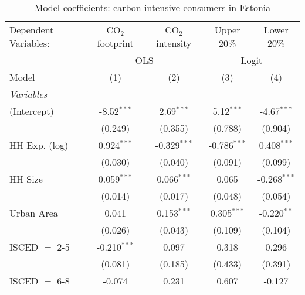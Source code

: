 
\begin{table}[htbp!]
   \centering
   \small
   \begin{adjustbox}{width = 1\textwidth, max height = 0.95\textheight, center}
      \begin{threeparttable}[b]
         \caption{\label{tab:Logit_1_EST} Model coefficients: carbon-intensive consumers in Estonia}
         \begin{tabular}{lcccc}
            \tabularnewline \midrule \midrule
            Dependent Variables: & CO$_{2}$ footprint & CO$_{2}$ intensity & Upper 20\%     & Lower 20\%\\   
             & \multicolumn{2}{c}{OLS} & \multicolumn{2}{c}{Logit} \\ 
            Model                & (1)                & (2)                & (3)            & (4)\\  
            \midrule
            \emph{Variables}\\
            (Intercept)          & -8.52$^{***}$      & 2.69$^{***}$       & 5.12$^{***}$   & -4.67$^{***}$\\   
                                 & (0.249)            & (0.355)            & (0.788)        & (0.904)\\   
            HH Exp. (log)        & 0.924$^{***}$      & -0.329$^{***}$     & -0.786$^{***}$ & 0.408$^{***}$\\   
                                 & (0.030)            & (0.040)            & (0.091)        & (0.099)\\   
            HH Size              & 0.059$^{***}$      & 0.066$^{***}$      & 0.065          & -0.268$^{***}$\\   
                                 & (0.014)            & (0.017)            & (0.048)        & (0.054)\\   
            Urban Area           & 0.041              & 0.153$^{***}$      & 0.305$^{***}$  & -0.220$^{**}$\\   
                                 & (0.026)            & (0.043)            & (0.109)        & (0.104)\\   
            ISCED $=$ 2-5        & -0.210$^{***}$     & 0.097              & 0.318          & 0.296\\   
                                 & (0.081)            & (0.185)            & (0.433)        & (0.391)\\   
            ISCED $=$ 6-8        & -0.074             & 0.231              & 0.607          & -0.127\\   

\end{tabular}
\end{threeparttable}
\end{adjustbox}
\end{table}
